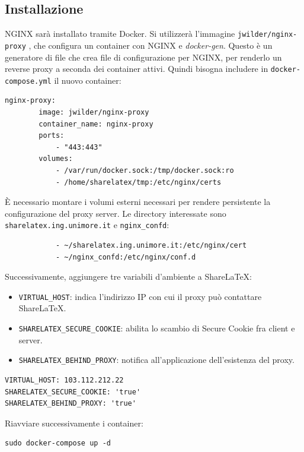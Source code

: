 \subsection{Installazione}
NGINX sarà installato tramite Docker. Si utilizzerà l'immagine \verb|jwilder/nginx-proxy| \cite{nginx-proxy}, che configura un container con NGINX e \emph{docker-gen}. Questo è un generatore di file che crea file di configurazione per NGINX, per renderlo un reverse proxy a seconda dei container attivi. Quindi bisogna includere in \verb|docker-compose.yml| il nuovo container:
\begin{lstlisting}
nginx-proxy:
        image: jwilder/nginx-proxy
        container_name: nginx-proxy
        ports:
            - "443:443"
        volumes:
            - /var/run/docker.sock:/tmp/docker.sock:ro
            - /home/sharelatex/tmp:/etc/nginx/certs
\end{lstlisting}
È necessario montare i volumi esterni necessari per rendere persistente la configurazione del proxy server. Le directory interessate sono \verb|sharelatex.ing.unimore.it| e \verb|nginx_confd|:
\begin{lstlisting}
            - ~/sharelatex.ing.unimore.it:/etc/nginx/cert
            - ~/nginx_confd:/etc/nginx/conf.d
\end{lstlisting}
Successivamente, aggiungere tre variabili d'ambiente a ShareLaTeX:
\begin{itemize}
    \item \verb|VIRTUAL_HOST|: indica l'indirizzo IP con cui il proxy può contattare ShareLaTeX.
    \item \verb|SHARELATEX_SECURE_COOKIE|: abilita lo scambio di Secure Cookie fra client e server.
    \item \verb|SHARELATEX_BEHIND_PROXY|: notifica all'applicazione dell'esistenza del proxy.
\end{itemize}
\begin{lstlisting}
VIRTUAL_HOST: 103.112.212.22
SHARELATEX_SECURE_COOKIE: 'true'
SHARELATEX_BEHIND_PROXY: 'true'
\end{lstlisting}
Riavviare successivamente i container:
\begin{lstlisting}
sudo docker-compose up -d
\end{lstlisting}

